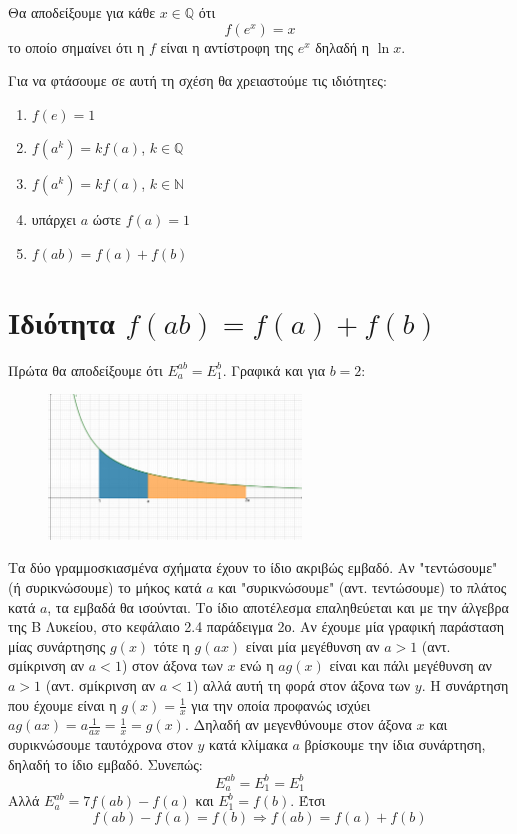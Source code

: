\documentclass[12pt,titlepage]{article}
\begin{document}
Θα αποδείξουμε για κάθε $x\in \mathbb{Q}$ ότι
$$f(e^x)=x$$
το οποίο σημαίνει ότι η $f$ είναι η αντίστροφη της $e^x$ δηλαδή η $\ln x$.

Για να φτάσουμε σε αυτή τη σχέση θα χρειαστούμε τις ιδιότητες:
\begin{enumerate}
  \item $f(e)=1$
  \item $f(a^k)=kf(a)$, $k\in \mathbb{Q}$
  \item $f(a^k)=kf(a)$, $k\in \mathbb{N}$
  \item υπάρχει $a$ ώστε $f(a)=1$
  \item $f(ab)=f(a)+f(b)$
\end{enumerate}

\section{Ιδιότητα $f(ab)=f(a)+f(b)$}
Πρώτα θα αποδείξουμε ότι $E_a^{ab}=E_1^b$. Γραφικά και για $b=2$:
\begin{figure}[h]
 \includegraphics[width=0.6\textwidth]{1overX.png}
 \centering
\end{figure}
Τα δύο γραμμοσκιασμένα σχήματα έχουν το ίδιο ακριβώς εμβαδό. Αν "τεντώσουμε" (ή συρικνώσουμε) το μήκος κατά $a$ και "συρικνώσουμε" (αντ. τεντώσουμε) το πλάτος κατά $a$, τα εμβαδά θα ισούνται. Το ίδιο αποτέλεσμα επαληθεύεται και με την άλγεβρα της Β Λυκείου, στο κεφάλαιο 2.4 παράδειγμα 2ο. Αν έχουμε μία γραφική παράσταση μίας συνάρτησης $g(x)$ τότε η $g(ax)$ είναι μία μεγέθυνση αν $a>1$ (αντ. σμίκρινση αν $a<1$) στον άξονα των $x$ ενώ η $ag(x)$ είναι και πάλι μεγέθυνση αν $a>1$ (αντ. σμίκρινση αν $a<1$) αλλά αυτή τη φορά στον άξονα των $y$. Η συνάρτηση που έχουμε είναι η $g(x)=\frac{1}{x}$ για την οποία προφανώς ισχύει $ag(ax)=a\frac{1}{ax}=\frac{1}{x}=g(x)$. Δηλαδή αν μεγενθύνουμε στον άξονα $x$ και συρικνώσουμε ταυτόχρονα στον $y$ κατά κλίμακα $a$ βρίσκουμε την ίδια συνάρτηση, δηλαδή το ίδιο εμβαδό. Συνεπώς:
$$E_a^{ab}=E_1^{b}=E_1^b$$
Αλλά $E_a^{ab}=7f(ab)-f(a)$ και $E_1^b=f(b)$. Έτσι
$$f(ab)-f(a)=f(b) \Rightarrow f(ab)=f(a)+f(b)$$
\end{document}
